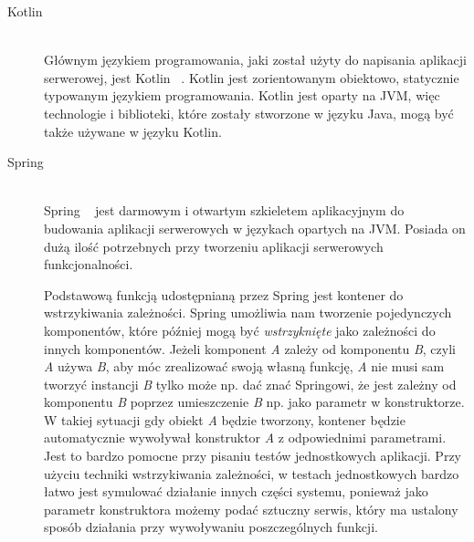 \begin{description}
  \item[Kotlin] \hfill \\ Głównym językiem programowania, jaki został użyty do napisania aplikacji serwerowej, jest Kotlin ~\cite{ref_kotlin_doc}. Kotlin jest zorientowanym obiektowo, statycznie typowanym językiem programowania. Kotlin jest oparty na JVM, więc technologie i biblioteki, które zostały stworzone w języku Java, mogą być także używane w języku Kotlin.
  \item[Spring] \hfill \\ Spring ~\cite{ref_spring_doc} jest darmowym i otwartym szkieletem aplikacyjnym do budowania aplikacji serwerowych w językach opartych na JVM. Posiada on dużą ilość potrzebnych przy tworzeniu aplikacji serwerowych funkcjonalności.

    Podstawową funkcją udostępnianą przez Spring jest kontener do wstrzykiwania zależności. Spring umożliwia nam tworzenie pojedynczych komponentów, które później mogą być \emph{wstrzyknięte} jako zależności do innych komponentów. Jeżeli komponent \emph{A} zależy od komponentu \emph{B}, czyli \emph{A} używa \emph{B}, aby móc zrealizować swoją własną funkcję, \emph{A} nie musi sam tworzyć instancji \emph{B} tylko może np. dać znać Springowi, że jest zależny od komponentu \emph{B} poprzez umieszczenie \emph{B} np. jako parametr w konstruktorze. W takiej sytuacji gdy obiekt \emph{A} będzie tworzony, kontener będzie automatycznie wywoływał konstruktor \emph{A} z odpowiednimi parametrami. Jest to bardzo pomocne przy pisaniu testów jednostkowych aplikacji. Przy użyciu techniki wstrzykiwania zależności, w testach jednostkowych bardzo łatwo jest symulować działanie innych części systemu, ponieważ jako parametr konstruktora możemy podać sztuczny serwis, który ma ustalony sposób działania przy wywoływaniu poszczególnych funkcji.


\end{description}
